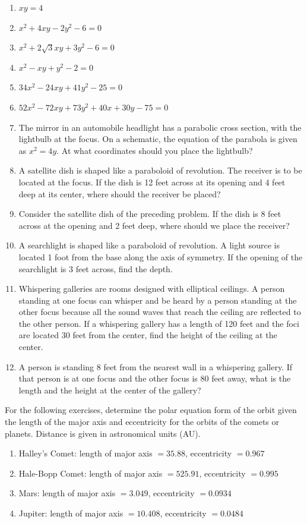 \documentclass{exercises}
\begin{document}
\begin{enumerate}[resume]
\item $xy=4$
\item $x^{2}+4xy-2y^{2}-6=0$
\item $x^{2}+2\sqrt{3}xy+3y^{2}-6=0$
\item $x^{2}-xy+y^{2}-2=0$
\item $34x^{2}-24xy+41y^{2}-25=0$
\item $52x^{2}-72xy+73y^{2}+40x+30y-75=0$
\item The mirror in an automobile headlight has a parabolic cross section, with the lightbulb at the focus. On a schematic, the equation of the parabola is given as $x^{2}=4y$. At what coordinates should you place the lightbulb?
\item A satellite dish is shaped like a paraboloid of revolution. The receiver is to be located at the focus. If the dish is 12 feet across at its opening and 4 feet deep at its center, where should the receiver be placed?
\item Consider the satellite dish of the preceding problem. If the dish is 8 feet across at the opening and 2 feet deep, where should we place the receiver?
\item A searchlight is shaped like a paraboloid of revolution. A light source is located 1 foot from the base along the axis of symmetry. If the opening of the searchlight is 3 feet across, find the depth.
\item Whispering galleries are rooms designed with elliptical ceilings. A person standing at one focus can whisper and be heard by a person standing at the other focus because all the sound waves that reach the ceiling are reflected to the other person. If a whispering gallery has a length of 120 feet and the foci are located 30 feet from the center, find the height of the ceiling at the center.
\item A person is standing 8 feet from the nearest wall in a whispering gallery. If that person is at one focus and the other focus is 80 feet away, what is the length and the height at the center of the gallery?
\end{enumerate}

For the following exercises, determine the polar equation form of the orbit given the length of the major axis and eccentricity for the orbits of the comets or planets. Distance is given in astronomical units (AU).

\begin{enumerate}[resume]
\item Halley's Comet: length of major axis $=35.88$, eccentricity $=0.967$
\item Hale-Bopp Comet: length of major axis $=525.91$, eccentricity $=0.995$
\item Mars: length of major axis $=3.049$, eccentricity $=0.0934$
\item Jupiter: length of major axis $=10.408$, eccentricity $=0.0484$
\end{enumerate}
\end{document}
